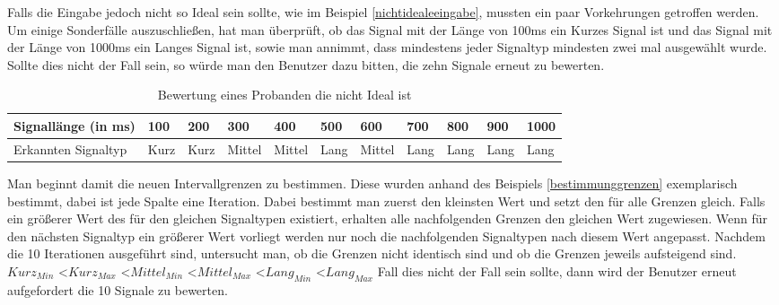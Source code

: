 Falls die Eingabe jedoch nicht so Ideal sein sollte, wie im Beispiel \autoref{nichtidealeeingabe}, mussten ein paar Vorkehrungen getroffen werden. Um einige Sonderf{\"a}lle auszuschlie{\ss}en, hat man {\"u}berpr{\"u}ft, ob das Signal mit der L{\"a}nge von 100ms ein Kurzes Signal ist und das Signal mit der L{\"a}nge von 1000ms ein Langes Signal ist, sowie man annimmt, dass mindestens jeder Signaltyp mindesten zwei mal ausgew{\"a}hlt wurde. Sollte dies nicht der Fall sein, so w{\"u}rde man den Benutzer dazu bitten, die zehn Signale erneut zu bewerten. 

\begin{table}[]
\centering
\caption{Bewertung eines Probanden die nicht Ideal ist}
\label{nichtidealeeingabe}
\begin{tabular}{|l|l|l|l|l|l|l|l|l|l|l|}
\hline
 Signall{\"a}nge (in ms) & 100 & 200 & 300 & 400 & 500 & 600 & 700 & 800 & 900 & 1000 \\ \hline
 Erkannten Signaltyp & Kurz & Kurz & Mittel & Mittel & Lang & Mittel & Lang & Lang & Lang & Lang \\ \hline
\end{tabular}
\end{table}

Man beginnt damit die neuen Intervallgrenzen zu bestimmen. Diese wurden anhand des Beispiels \autoref{bestimmunggrenzen} exemplarisch bestimmt, dabei ist jede Spalte eine Iteration. Dabei bestimmt man zuerst den kleinsten Wert und setzt den f{\"u}r alle Grenzen gleich. Falls ein gr{\"o}{\ss}erer Wert des f{\"u}r den gleichen Signaltypen existiert, erhalten alle nachfolgenden Grenzen den gleichen Wert zugewiesen. Wenn f{\"u}r den n{\"a}chsten Signaltyp ein gr{\"o}{\ss}erer Wert vorliegt werden nur noch die nachfolgenden Signaltypen nach diesem Wert angepasst. Nachdem die 10 Iterationen ausgef{\"u}hrt sind, untersucht man, ob die Grenzen nicht identisch sind und ob die Grenzen jeweils aufsteigend sind. 
\\$Kurz_{Min}$ \textless $Kurz_{Max}$ \textless $Mittel_{Min}$ \textless $Mittel_{Max}$ \textless $Lang_{Min}$ \textless $Lang_{Max}$
Fall dies nicht der Fall sein sollte, dann wird der Benutzer erneut aufgefordert die 10 Signale zu bewerten.

